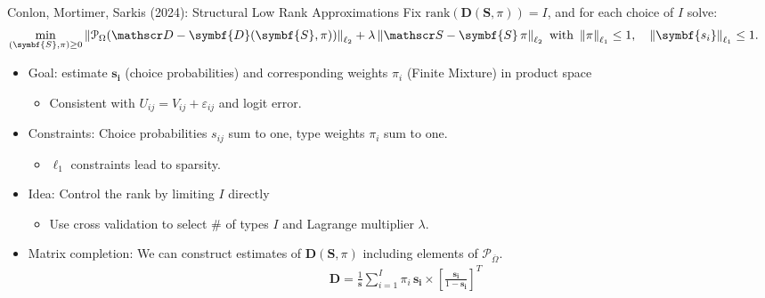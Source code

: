 \documentclass[aspectratio=169,10pt]{beamer}
\begin{document}
\begin{frame}{Conlon, Mortimer, Sarkis (2024): Structural Low Rank Approximations}
\small
Fix $\textrm{rank}(\symbf{D}(\symbf{S},\pi))=I$, and for each choice of $I$ solve:
\begin{align*}
\min _{(\symbf{S}, \pi) \geq 0} \left\|\mathcal{P}_{\Omega}(\calD-\symbf{D}(\symbf{S},\pi))\right\|_{\ell_2}  &+ \lambda \left\|\calS- \symbf{S}\,\pi \right\|_{\ell_2} \text { with } \left\|\pi  \right\|_{\ell_1} \leq 1, \quad   \left\|\symbf{s_i}  \right\|_{\ell_1} \leq 1.
\end{align*}
\vspace{-.25cm}
\begin{itemize}
\item Goal: estimate $\symbf{s_i}$ (choice probabilities) and corresponding weights $\pi_i$ (Finite Mixture) in \alert{product space}
\begin{itemize}
\item Consistent with $U_{ij} = V_{ij} + \varepsilon_{ij}$ and logit error.
\end{itemize}
\item Constraints: Choice probabilities $s_{ij}$ sum to one, type weights $\pi_i$ sum to one.
\begin{itemize}
\item $\ell_1$ constraints lead to \alert{sparsity}.
\end{itemize}
\item Idea: \alert{Control the rank by limiting $I$ directly}
\begin{itemize}
\item Use cross validation to select \# of types $I$ and Lagrange multiplier $\lambda$.
\end{itemize}
\item Matrix completion: We can construct estimates of $\symbf{D}(\symbf{S},\pi)$ including elements of $\mathcal{P}_{\overline{\Omega}}$.
\begin{align*}
    & \symbf{D}= \frac{1}{\symbf{s}}\sum_{i = 1}^I \pi_i \, \symbf{s_i} \times \left[\frac{\symbf{s_{i}}}{1-\symbf{s_i}}\right]^T
\end{align*}
\end{itemize}
\end{frame}
\end{document}
